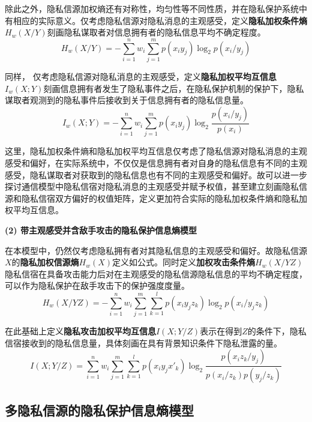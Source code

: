 除此之外，隐私信源加权熵还有对称性，均匀性等不同性质，并在隐私保护系统中有相应的实际意义。仅考虑隐私信源对隐私消息的主观感受，定义\textbf{隐私加权条件熵}$H_{w}(X/Y)$刻画隐私谋取者对信息拥有者的隐私信息平均不确定程度。
\begin{equation}
H_{w}(X/Y)=-\sum_{i=1}^{n}w_{i}\sum_{j=1}^{m}p(x_{i}y_{j})\log_{2}p(x_{i}/y_{j})
\end{equation}

同样， 仅考虑隐私信源对隐私消息的主观感受，定义\textbf{隐私加权平均互信息}$I_{w}(X;Y)$刻画信息拥有者发生了隐私事件之后，在隐私保护机制的保护下，隐私谋取者观测到的隐私事件后接收到关于信息拥有者的隐私信息量。
\begin{equation}
I_{w}(X;Y)=-\sum_{i=1}^{n}w_{i}\sum_{j=1}^{m}p(x_{i}y_{j})\log_{2}\frac{p(x_{i}/y_{j})}{p(x_{i})}
\end{equation}

这里，隐私加权条件熵和隐私加权平均互信息仅考虑了隐私信源对隐私消息的主观感受和偏好，在实际系统中，不仅仅是信息拥有者对自身的隐私信息有不同的主观感受，隐私谋取者对获取到的隐私信息也有不同的主观感受和偏好。故可以进一步探讨通信模型中隐私信宿对隐私消息的主观感受并赋予权值，甚至建立刻画隐私信源和隐私信宿双方偏好的权值矩阵，定义更加符合实际的隐私加权条件熵和隐私加权平均互信息。

\textbf{(2) 带主观感受并含敌手攻击的隐私保护信息熵模型}

在本模型中，仍然仅考虑隐私拥有者对其隐私信息的主观感受和偏好。故隐私信源$X$的\textbf{隐私加权信源熵}$H_{w}(X)$定义如公式。同时定义\textbf{加权攻击条件熵}$H_{w}(X/YZ)$隐私信宿在具备攻击能力后对在主观感受的隐私信源隐私信息的平均不确定程度，可以作为隐私保护在敌手攻击下的保护强度度量。
\begin{equation}
H_{w}(X/YZ)=-\sum_{i=1}^{n}w_{i}\sum_{j=1}^{m}\sum_{k=1}^{l}p(x_{i}y_{j}z_{k})\log_{2}p(x_{i}/y_{j}z_{k})
\end{equation}

在此基础上定义\textbf{隐私攻击加权平均互信息}$I(X;Y/Z)$表示在得到$Z$的条件下，隐私信宿接收到的隐私信息量，具体刻画在具有背景知识条件下隐私泄露的量。
\begin{equation}
I(X;Y/Z)=\sum_{i=1}^{n}w_{i}\sum_{j=1}^{m}\sum_{k=1}^{l}p(x_{i}y_{j}{x}'_{k})\log_{2}\frac{p(x_{i}z_{k}/y_{j})}{p(x_{i}/z_{k})p(y_{j}/z_{k})}
\end{equation}

\subsection{多隐私信源的隐私保护信息熵模型}

